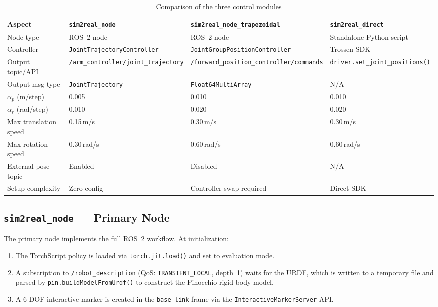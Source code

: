 \documentclass[12pt, a4paper]{article}
\begin{document}
\begin{table}[h]
\centering
\caption{Comparison of the three control modules}
\label{tab:nodes}
\begin{tabularx}{\textwidth}{lXXX}
\toprule
\textbf{Aspect} &
\textbf{\texttt{sim2real\_node}} &
\textbf{\texttt{sim2real\_node\_trapezoidal}} &
\textbf{\texttt{sim2real\_direct}} \\
\midrule
Node type        & ROS~2 node & ROS~2 node & Standalone Python script \\
Controller       & \texttt{JointTrajectoryController} & \texttt{JointGroupPositionController} & Trossen SDK \\
Output topic/API & \texttt{/arm\_controller/joint\_trajectory} & \texttt{/forward\_position\_controller/commands} & \texttt{driver.set\_joint\_positions()} \\
Output msg type  & \texttt{JointTrajectory} & \texttt{Float64MultiArray} & N/A \\
$\alpha_p$ (m/step)  & 0.005 & 0.010 & 0.010 \\
$\alpha_r$ (rad/step) & 0.010 & 0.020 & 0.020 \\
Max translation speed & 0.15\,m/s & 0.30\,m/s & 0.30\,m/s \\
Max rotation speed & 0.30\,rad/s & 0.60\,rad/s & 0.60\,rad/s \\
External pose topic & Enabled & Disabled & N/A \\
Setup complexity & Zero-config & Controller swap required & Direct SDK \\
\bottomrule
\end{tabularx}
\end{table}

\subsection{\texttt{sim2real\_node} — Primary Node}
\label{ssec:sim2real_node}

The primary node implements the full ROS~2 workflow. At initialization:
\begin{enumerate}
  \item The TorchScript policy is loaded via \texttt{torch.jit.load()} and set to evaluation mode.
  \item A subscription to \texttt{/robot\_description} (QoS: \texttt{TRANSIENT\_LOCAL}, depth~1)
        waits for the URDF, which is written to a temporary file and parsed by
        \texttt{pin.buildModelFromUrdf()} to construct the Pinocchio rigid-body model.
  \item A 6-DOF interactive marker is created in the \texttt{base\_link} frame via the
        \texttt{InteractiveMarkerServer} API.
\end{enumerate}
\end{document}
